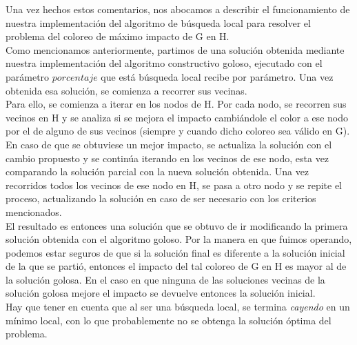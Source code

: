 \indent Una vez hechos estos comentarios, nos abocamos a describir el funcionamiento de nuestra implementación del algoritmo de búsqueda local para resolver el problema del coloreo de máximo impacto de G en H.\\
\indent Como mencionamos anteriormente, partimos de una solución obtenida mediante nuestra implementación del algoritmo constructivo goloso, ejecutado con el parámetro $porcentaje$ que está búsqueda local recibe por parámetro. Una vez obtenida esa solución, se comienza a recorrer sus vecinas.\\
\indent Para ello, se comienza a iterar en los nodos de H. Por cada nodo, se recorren sus vecinos en H y se analiza si se mejora el impacto cambiándole el color a ese nodo por el de alguno de sus vecinos (siempre y cuando dicho coloreo sea válido en G). En caso de que se obtuviese un mejor impacto, se actualiza la solución con el cambio propuesto y se continúa iterando en los vecinos de ese nodo, esta vez comparando la solución parcial con la nueva solución obtenida. Una vez recorridos todos los vecinos de ese nodo en H, se pasa a otro nodo y se repite el proceso, actualizando la solución en caso de ser necesario con los criterios mencionados.\\
\indent El resultado es entonces una solución que se obtuvo de ir modificando la primera solución obtenida con el algoritmo goloso. Por la manera en que fuimos operando, podemos estar seguros de que si la solución final es diferente a la solución inicial de la que se partió, entonces el impacto del tal coloreo de G en H es mayor al de la solución golosa. En el caso en que ninguna de las soluciones vecinas de la solución golosa mejore el impacto se devuelve entonces la solución inicial.\\
\indent Hay que tener en cuenta que al ser una búsqueda local, se termina \textit{cayendo} en un mínimo local, con lo que probablemente no se obtenga la solución óptima del problema.


